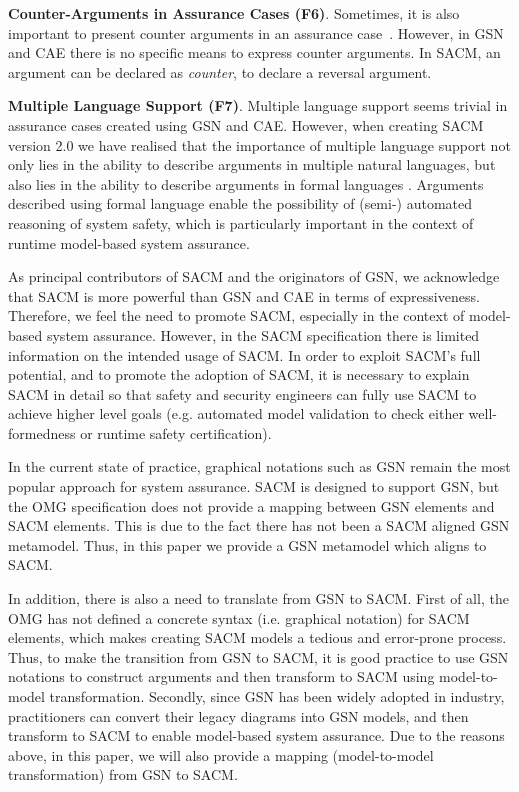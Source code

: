 \textbf{Counter-Arguments in Assurance Cases (F6)}. Sometimes, it is also important to present counter arguments in an assurance case~\cite{armstrong2004deconstruction}.
However, in GSN and CAE there is no specific means to express counter arguments. 
In SACM, an argument can be declared as \textit{counter}, to declare a reversal argument.

\textbf{Multiple Language Support (F7)}. Multiple language support seems trivial in assurance cases created using GSN and CAE.
However, when creating SACM version 2.0 we have realised that the importance of multiple language support not only lies in the ability to describe arguments in multiple natural languages, but also lies in the ability to describe arguments in formal languages \cite{denney2013formal}.
Arguments described using formal language enable the possibility of (semi-) automated reasoning of system safety, which is particularly important in the context of runtime model-based system assurance.

As principal contributors of SACM and the originators of GSN, we acknowledge that SACM is more powerful than GSN and CAE in terms of expressiveness.
Therefore, we feel the need to promote SACM, especially in the context of model-based system assurance.
However, in the SACM specification there is limited information on the intended usage of SACM. 
In order to exploit SACM's full potential, and to promote the adoption of SACM, it is necessary to explain SACM in detail so that safety and security engineers can fully use SACM to achieve higher level goals (e.g. automated model validation to check either well-formedness or runtime safety certification). 

In the current state of practice, graphical notations such as GSN remain the most popular approach for system assurance. 
SACM is designed to support GSN, but the OMG specification does not provide a mapping between GSN elements and SACM elements. 
This is due to the fact there has not been a SACM aligned GSN metamodel. 
Thus, in this paper we provide a GSN metamodel which aligns to SACM. 

In addition, there is also a need to translate from GSN to SACM. 
First of all, the OMG has not defined a concrete syntax (i.e. graphical notation) for SACM elements, which makes creating SACM models a tedious and error-prone process. 
Thus, to make the transition from GSN to SACM, it is good practice to use GSN notations to construct arguments and then transform to SACM using model-to-model transformation. 
Secondly, since GSN has been widely adopted in industry, practitioners can convert their legacy diagrams into GSN models, and then transform to SACM to enable model-based system assurance. 
Due to the reasons above, in this paper, we will also provide a mapping (model-to-model transformation) from GSN to SACM.

